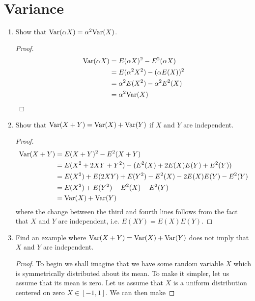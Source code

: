 \documentclass{article}
\begin{document}
\section{Variance}
    \begin{enumerate}[label=\roman*)]
        \item Show that $\text{Var}(\alpha X) = \alpha^2\text{Var}(X)$.  
            \begin{proof}
                \begin{align*}
                    \text{Var}(\alpha X) &= E(\alpha X)^2 - E^2(\alpha X)\\
                    &= E(\alpha^2X^2) - (\alpha E(X))^2\\
                    &= \alpha^2E(X^2) - \alpha^2 E^2(X)\\
                    &= \alpha^2\text{Var}(X)
                \end{align*}
            \end{proof}
        \item Show that $\text{Var}(X + Y) = \text{Var}(X) + \text{Var}(Y)$ if $X$ and $Y$ are
        independent.
            \begin{proof}
                \begin{align*}
                    \text{Var}(X + Y) &= E(X + Y)^2 - E^2(X + Y)\\
                    &= E(X^2 + 2XY + Y^2) - (E^2(X) + 2E(X)E(Y) + E^2(Y))\\
                    &= E(X^2) + E(2XY) + E(Y^2) - E^2(X) - 2E(X)E(Y) - E^2(Y)\\
                    &= E(X^2) + E(Y^2) - E^2(X) - E^2(Y)\\
                    &= \text{Var}(X) + \text{Var}(Y)
                \end{align*} 
                where the change between the third and fourth lines follows from
                the fact that $X$ and $Y$ are independent, i.e. $E(XY) =
                E(X)E(Y)$.
            \end{proof}
        \item Find an example where $\text{Var}(X + Y) = \text{Var}(X) + \text{Var}(Y)$ does not
        imply that $X$ and $Y$ are independent. 
            \begin{proof}
                To begin we shall imagine that we have some random variable $X$
                which is symmetrically distributed about its mean. To make it
                simpler, let us assume that its mean is zero. Let us assume that
                $X$ is a uniform distribution centered on zero $X \in [-1,1]$. We can then make

\end{proof}
\end{enumerate}
\end{document}
